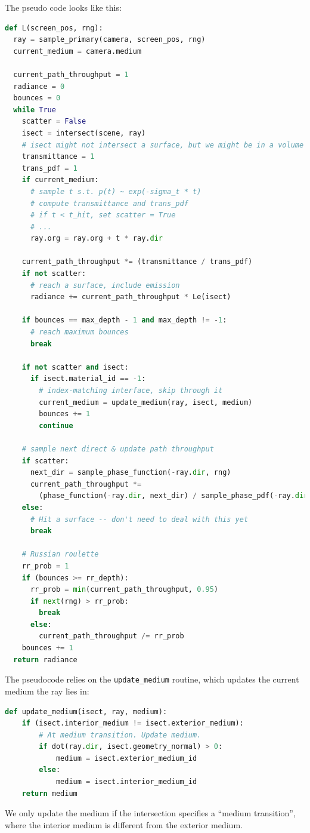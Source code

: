 The pseudo code looks like this:
\begin{lstlisting}[language=python]
def L(screen_pos, rng):
  ray = sample_primary(camera, screen_pos, rng)
  current_medium = camera.medium

  current_path_throughput = 1
  radiance = 0
  bounces = 0
  while True
    scatter = False
    isect = intersect(scene, ray)
    # isect might not intersect a surface, but we might be in a volume
    transmittance = 1
    trans_pdf = 1
    if current_medium:
      # sample t s.t. p(t) ~ exp(-sigma_t * t)
      # compute transmittance and trans_pdf
      # if t < t_hit, set scatter = True
      # ...
      ray.org = ray.org + t * ray.dir
    
    current_path_throughput *= (transmittance / trans_pdf)
    if not scatter:
      # reach a surface, include emission
      radiance += current_path_throughput * Le(isect)

    if bounces == max_depth - 1 and max_depth != -1:
      # reach maximum bounces
      break

    if not scatter and isect:
      if isect.material_id == -1:
        # index-matching interface, skip through it
        current_medium = update_medium(ray, isect, medium)
        bounces += 1
        continue

    # sample next direct & update path throughput
    if scatter:
      next_dir = sample_phase_function(-ray.dir, rng)
      current_path_throughput *=
        (phase_function(-ray.dir, next_dir) / sample_phase_pdf(-ray.dir, next_dir)) * sigma_s
    else:
      # Hit a surface -- don't need to deal with this yet
      break
    
    # Russian roulette
    rr_prob = 1
    if (bounces >= rr_depth):
      rr_prob = min(current_path_throughput, 0.95)
      if next(rng) > rr_prob:
        break
      else:
        current_path_throughput /= rr_prob
    bounces += 1
  return radiance
\end{lstlisting}

The pseudocode relies on the \lstinline{update_medium} routine, which updates the current medium the ray lies in:
\begin{lstlisting}[language=python]
def update_medium(isect, ray, medium):
    if (isect.interior_medium != isect.exterior_medium):
        # At medium transition. Update medium.
        if dot(ray.dir, isect.geometry_normal) > 0:
            medium = isect.exterior_medium_id
        else:
            medium = isect.interior_medium_id
    return medium
\end{lstlisting}
We only update the medium if the intersection specifies a ``medium transition'', where the interior medium
is different from the exterior medium.

